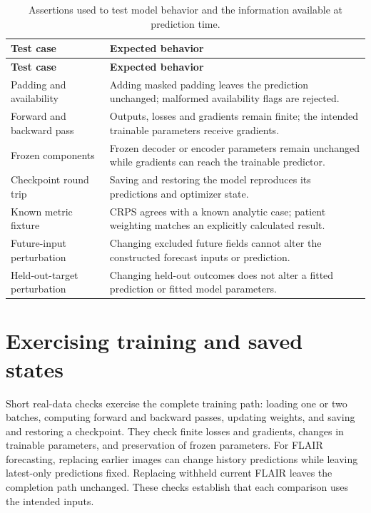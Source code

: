 \begingroup\singlespacing\small\setlength{\tabcolsep}{4pt}\renewcommand{\arraystretch}{1.25}
\begin{longtable}{>{\raggedright\arraybackslash}p{}>{\raggedright\arraybackslash}p{}}
\caption[Component and information-cutoff checks]{Assertions used to test model behavior and the information available at prediction time.}\label{tab:6.1}\\
\toprule \textbf{Test case} & \textbf{Expected behavior} \\\midrule\endfirsthead
\toprule \textbf{Test case} & \textbf{Expected behavior} \\\midrule\endhead
\bottomrule\endfoot
Padding and availability & Adding masked padding leaves the prediction unchanged; malformed availability flags are rejected. \\
Forward and backward pass & Outputs, losses and gradients remain finite; the intended trainable parameters receive gradients. \\
Frozen components & Frozen decoder or encoder parameters remain unchanged while gradients can reach the trainable predictor. \\
Checkpoint round trip & Saving and restoring the model reproduces its predictions and optimizer state. \\
Known metric fixture & CRPS agrees with a known analytic case; patient weighting matches an explicitly calculated result. \\
Future-input perturbation & Changing excluded future fields cannot alter the constructed forecast inputs or prediction. \\
Held-out-target perturbation & Changing held-out outcomes does not alter a fitted prediction or fitted model parameters. \\
\end{longtable}\endgroup

\section{Exercising training and saved states}

Short real-data checks exercise the complete training path: loading one or two batches, computing forward and backward passes, updating weights, and saving and restoring a checkpoint. They check finite losses and gradients, changes in trainable parameters, and preservation of frozen parameters. For FLAIR forecasting, replacing earlier images can change history predictions while leaving latest-only predictions fixed. Replacing withheld current FLAIR leaves the completion path unchanged. These checks establish that each comparison uses the intended inputs.


